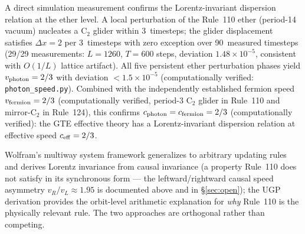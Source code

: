 \documentclass[11pt]{article}
\theoremstyle{remark}
\begin{document}
A direct simulation measurement confirms the Lorentz-invariant dispersion relation at the ether level. A local perturbation of the Rule~110 ether (period-14 vacuum) nucleates a C$_2$ glider within 3~timesteps; the glider displacement satisfies $\Delta x = 2$ per 3~timesteps with zero exception over 90~measured timesteps (29/29 measurements: $L = 1260$, $T = 600$ steps, deviation $1.48\times10^{-5}$, consistent with $O(1/L)$ lattice artifact). All five persistent ether perturbation phases yield $v_{\rm photon} = 2/3$ with deviation $< 1.5\times10^{-5}$ (computationally verified: \texttt{photon\_speed.py}). Combined with the independently established fermion speed $v_{\rm fermion} = 2/3$ (computationally verified, period-3 C$_2$ glider in Rule~110 and mirror-C$_2$ in Rule~124), this confirms $c_{\rm photon} = c_{\rm fermion} = 2/3$ (computationally verified): the GTE effective theory has a Lorentz-invariant dispersion relation at effective speed $c_{\rm eff} = 2/3$.

Wolfram's multiway system framework generalizes to arbitrary updating rules and derives Lorentz invariance from causal invariance (a property Rule~110 does not satisfy in its synchronous form --- the leftward/rightward causal speed asymmetry $v_R/v_L \approx 1.95$ is documented above and in \S\ref{sec:open}); the UGP derivation provides the orbit-level arithmetic explanation for \emph{why} Rule~110 is the physically relevant rule.
The two approaches are orthogonal rather than competing.
\end{document}
